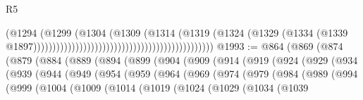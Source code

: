 \begin{lexlean}{R5}
\begin{coremodule}
                                                                              (@1294
                                                                                (@1299
                                                                                  (@1304
                                                                                    (@1309
                                                                                      (@1314
                                                                                        (@1319
                                                                                          (@1324
                                                                                            (@1329
                                                                                              (@1334
                                                                                                (@1339
                                                                                                  @1897)))))))))))))))))))))))))))))))))))))))))))))))
@1993 := @864
    (@869
      (@874
        (@879
          (@884
            (@889
              (@894
                (@899
                  (@904
                    (@909
                      (@914
                        (@919
                          (@924
                            (@929
                              (@934
                                (@939
                                  (@944
                                    (@949
                                      (@954
                                        (@959
                                          (@964
                                            (@969
                                              (@974
                                                (@979
                                                  (@984
                                                    (@989
                                                      (@994
                                                        (@999
                                                          (@1004
                                                            (@1009
                                                              (@1014
                                                                (@1019
                                                                  (@1024
                                                                    (@1029
                                                                      (@1034
                                                                        (@1039

\end{coremodule}
\end{lexlean}
